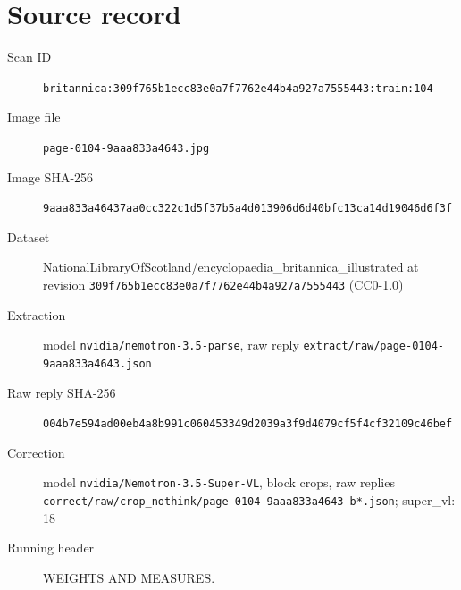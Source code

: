 \documentclass{article}
\begin{document}
\section*{Source record}
\begin{description}
\item[Scan ID] \texttt{britannica:309f765b1ecc83e0a7f7762e44b4a927a7555443:train:104}
\item[Image file] \texttt{page-0104-9aaa833a4643.jpg}
\item[Image SHA-256] \texttt{9aaa833a46437aa0cc322c1d5f37b5a4d013906d6d40bfc13ca14d19046d6f3f}
\item[Dataset] NationalLibraryOfScotland/encyclopaedia\_britannica\_illustrated at revision \texttt{309f765b1ecc83e0a7f7762e44b4a927a7555443} (CC0-1.0)
\item[Extraction] model \texttt{nvidia/nemotron-3.5-parse}, raw reply \texttt{extract/raw/page-0104-9aaa833a4643.json}
\item[Raw reply SHA-256] \texttt{004b7e594ad00eb4a8b991c060453349d2039a3f9d4079cf5f4cf32109c46bef}
\item[Correction] model \texttt{nvidia/Nemotron-3.5-Super-VL}, block crops, raw replies \texttt{correct/raw/crop\_nothink/page-0104-9aaa833a4643-b*.json}; super\_vl: 18
\item[Running header] WEIGHTS AND MEASURES.
\end{description}
\end{document}
